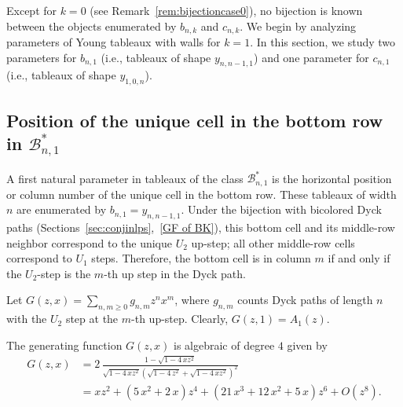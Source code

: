 \documentclass[a4paper,UKenglish,cleveref, autoref, thm-restate]{lipics-v2021}
\newcommand{\Bc}{\mathcal{B}}
\begin{document}
Except for $k=0$ (see Remark~\ref{rem:bijectioncase0}), no bijection is known between the objects enumerated by $b_{n,k}$ and $c_{n,k}$. We begin by analyzing parameters of Young tableaux with walls for $k=1$.
In this section, we study two parameters for
$b_{n,1}$ (i.e., tableaux of shape $y_{n,n-1,1}$) and one parameter for
$c_{n,1}$ (i.e., tableaux of shape $y_{1,0,n}$).

\subsection{Position of the unique cell in the bottom row in \texorpdfstring{$\Bc_{n,1}^*$}{B*\_{n,1}}}

A first natural parameter in tableaux of the class $\Bc^*_{n,1}$ is the horizontal position or column number of the unique cell in the bottom row.
These tableaux of width $n$ are enumerated by $b_{n,1} = y_{n,n-1,1}$.
Under the bijection with bicolored Dyck paths (Sections~\ref{sec:conjinlps},~\ref{GF of BK}), this bottom cell and its middle-row neighbor correspond to the unique $U_2$ up-step; all other middle-row cells correspond to $U_1$ steps.
Therefore, the bottom cell is in column $m$ if and only if the $U_2$-step is the $m$-th up step in the Dyck path.

Let $G(z,x)=\sum_{n,m\ge 0} g_{n,m} z^{n}x^{m}$, where $g_{n,m}$ counts Dyck paths of length $n$ with the $U_2$ step at the $m$-th up-step. Clearly, $G(z,1)=A_1(z)$.

\begin{proposition}\label{prop:GFGzxBcol}
    The generating function $G(z,x)$ is algebraic of degree $4$ given by
    \begin{align*}
        G(z,x) &= 2\,{\frac {1-\sqrt {1-4\,x{z}^{2}}}{\sqrt {1-4\,x{z}^{2}} 
                    \left( \sqrt {1-4\,{z}^{2}}+\sqrt {1-4\,x{z}^{2}} \right) ^{2}}}
               \\&= 
               x{z}^{2}+ \left( 5\,{x}^{2}+2\,x \right) {z}^{4}+ \left( 21\,{x}^{3}+
                12\,{x}^{2}+5\,x \right) {z}^{6}+ O ( {z}^{8} ) 
            .
    \end{align*}
\end{proposition}
\end{document}
